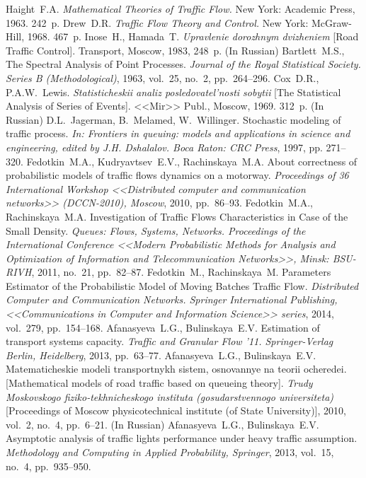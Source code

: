 \documentclass[a4paper,twoside]{article}
\theoremstyle{theorem}
\theoremstyle{remark}
\newcommand{\No}{\textnumero}
\begin{document}
\bigskip\bigskip{}
\begin{thebibliography}{99}

\bibitem{} Haight~F.A. {\it Mathematical Theories of Traffic Flow.} New York: Academic Press, 1963. 242~p.
\bibitem{} Drew~D.R. {\it Traffic Flow Theory and Control.} New York: McGraw-Hill, 1968. 467~p.
\bibitem{} Inose~H., Hamada~T. {\it Upravlenie dorozhnym dvizheniem} [Road Traffic Control]. Transport, Moscow, 1983, 248~p. (In Russian)
\bibitem{} Bartlett~M.S., The Spectral Analysis of Point Processes. {\it Journal of the Royal Statistical Society. Series B (Methodological)}, 1963, vol.~25, no.~2, pp.~264--296.
\bibitem{} Cox~D.R., P.A.W.~Lewis. {\it Statisticheskii analiz posledovatel'nosti sobytii} [The Statistical Analysis of Series of Events]. <<Mir>> Publ., Moscow, 1969. 312~p. (In Russian)
\bibitem{} D.L.~Jagerman, B.~Melamed, W.~Willinger. Stochastic modeling of traffic process. {\it In: Frontiers in queuing: models and applications in science and engineering, edited by J.H. Dshalalov. Boca Raton: CRC Press}, 1997, pp. 271–320.
\bibitem{} Fedotkin~M.A., Kudryavtsev~E.V., Rachinskaya~M.A.  About correctness of probabilistic models of traffic flows dynamics on a motorway. {\it Proceedings of 36 International Workshop <<Distributed computer and communication networks>> (DCCN-2010), Moscow}, 2010, pp.~86--93.
\bibitem{} Fedotkin~M.A., Rachinskaya~M.A.  Investigation of Traffic Flows Characteristics in Case of the Small Density. {\it Queues: Flows, Systems, Networks. Proceedings of the International Conference <<Modern Probabilistic Methods for Analysis and Optimization of Information and Telecommunication Networks>>, Minsk: BSU-RIVH}, 2011, no.~21, pp.~82--87.
\bibitem{} Fedotkin~M., Rachinskaya~M. Parameters Estimator of the Probabilistic Model of Moving Batches Traffic Flow. {\it Distributed Computer and Communication Networks. Springer International Publishing, <<Communications in Computer and Information Science>> series}, 2014, vol.~279, pp.~154--168.
\bibitem{} Afanasyeva~L.G., Bulinskaya~E.V.  Estimation of transport systems capacity. {\it Traffic and Granular Flow '11. Springer-Verlag Berlin, Heidelberg}, 2013, pp.~63--77.
\bibitem{} Afanasyeva~L.G., Bulinskaya~E.V.  Matematicheskie modeli transportnykh sistem, osnovannye na teorii ocheredei. [Mathematical models of road traffic based on queueing theory]. {\it Trudy Moskovskogo fiziko-tekhnicheskogo instituta (gosudarstvennogo universiteta)} [Proceedings of Moscow physicotechnical institute (of State University)], 2010, vol.~2, no.~4, pp.~6--21. (In Russian)
\bibitem{} Afanasyeva~L.G., Bulinskaya~E.V.  Asymptotic analysis of traffic lights performance under heavy traffic assumption. {\it Methodology and Computing in Applied Probability, Springer}, 2013, vol.~15, no.~4, pp.~935--950.


\end{thebibliography}
\end{document}

